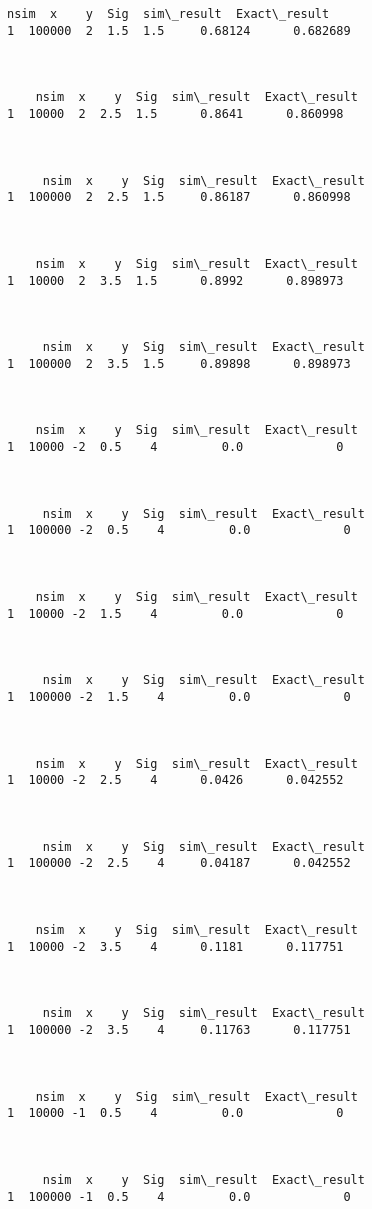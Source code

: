\documentclass[12pt]{article}
\begin{document}
\begin{Verbatim}[commandchars=\\\{\}]
     nsim  x    y  Sig  sim\_result  Exact\_result
1  100000  2  1.5  1.5     0.68124      0.682689



    nsim  x    y  Sig  sim\_result  Exact\_result
1  10000  2  2.5  1.5      0.8641      0.860998



     nsim  x    y  Sig  sim\_result  Exact\_result
1  100000  2  2.5  1.5     0.86187      0.860998



    nsim  x    y  Sig  sim\_result  Exact\_result
1  10000  2  3.5  1.5      0.8992      0.898973



     nsim  x    y  Sig  sim\_result  Exact\_result
1  100000  2  3.5  1.5     0.89898      0.898973



    nsim  x    y  Sig  sim\_result  Exact\_result
1  10000 -2  0.5    4         0.0             0



     nsim  x    y  Sig  sim\_result  Exact\_result
1  100000 -2  0.5    4         0.0             0



    nsim  x    y  Sig  sim\_result  Exact\_result
1  10000 -2  1.5    4         0.0             0



     nsim  x    y  Sig  sim\_result  Exact\_result
1  100000 -2  1.5    4         0.0             0



    nsim  x    y  Sig  sim\_result  Exact\_result
1  10000 -2  2.5    4      0.0426      0.042552



     nsim  x    y  Sig  sim\_result  Exact\_result
1  100000 -2  2.5    4     0.04187      0.042552



    nsim  x    y  Sig  sim\_result  Exact\_result
1  10000 -2  3.5    4      0.1181      0.117751



     nsim  x    y  Sig  sim\_result  Exact\_result
1  100000 -2  3.5    4     0.11763      0.117751



    nsim  x    y  Sig  sim\_result  Exact\_result
1  10000 -1  0.5    4         0.0             0



     nsim  x    y  Sig  sim\_result  Exact\_result
1  100000 -1  0.5    4         0.0             0




\end{Verbatim}
\end{document}
